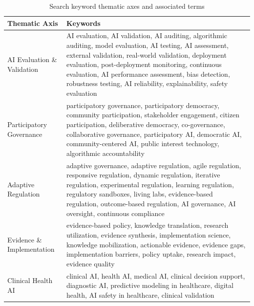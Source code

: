 \begin{table}[h]
\centering
\begin{threeparttable}
\caption{Search keyword thematic axes and associated terms}
\label{tab:keywords}
\begin{tabularx}{\linewidth}{p{3.5cm} X}
\toprule
\textbf{Thematic Axis} & \textbf{Keywords} \\
\midrule
AI Evaluation \& Validation &
AI evaluation, AI validation, AI auditing, algorithmic auditing,
model evaluation, AI testing, AI assessment, external validation,
real-world validation, deployment evaluation, post-deployment monitoring,
continuous evaluation, AI performance assessment, bias detection,
robustness testing, AI reliability, explainability, safety evaluation \\
\midrule
Participatory Governance &
participatory governance, participatory democracy, community participation,
stakeholder engagement, citizen participation, deliberative democracy,
co-governance, collaborative governance, participatory AI, democratic AI,
community-centered AI, public interest technology, algorithmic accountability \\
\midrule
Adaptive Regulation &
adaptive governance, adaptive regulation, agile regulation, responsive
regulation, dynamic regulation, iterative regulation, experimental
regulation, learning regulation, regulatory sandboxes, living labs,
evidence-based regulation, outcome-based regulation, AI governance,
AI oversight, continuous compliance \\
\midrule
Evidence \& Implementation &
evidence-based policy, knowledge translation, research utilization,
evidence synthesis, implementation science, knowledge mobilization,
actionable evidence, evidence gaps, implementation barriers,
policy uptake, research impact, evidence quality \\
\midrule
Clinical Health AI &
clinical AI, health AI, medical AI, clinical decision support,
diagnostic AI, predictive modeling in healthcare, digital health,
AI safety in healthcare, clinical validation \\
\bottomrule
\end{tabularx}
\end{threeparttable}
\end{table}


